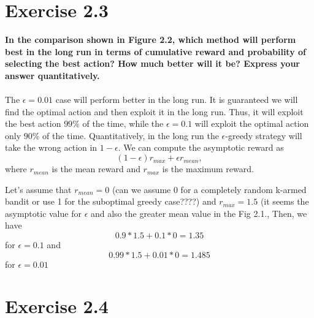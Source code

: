 \documentclass[a4paper,11pt]{article}
\numberwithin{equation}{section}
\theoremstyle{remark}
\begin{document}
\section{Exercise 2.3}

\textbf{In the comparison shown in Figure 2.2, which method will perform best in the long run in terms of cumulative reward and probability of selecting the best action? How much better will it be? Express your answer quantitatively.}
\\ \\

The $\epsilon=0.01$ case will perform better in the long run. It is guaranteed we will find the optimal action and then exploit it in the long run. Thus, it will exploit the best action  $99\%$ of the time, while the $\epsilon=0.1$  will exploit the optimal action only $90\%$ of the time.
Quantitatively, in the long run the $\epsilon$-greedy strategy will take the wrong action in $1 - \epsilon$. We can compute the asymptotic reward as
 $$(1 - \epsilon) r_{max} + \epsilon r_{mean},$$
where  $r_{mean}$ is the mean reward and  $r_{max}$ is the maximum reward. 

Let's assume that $r_{mean}=0$ (can we assume 0 for a completely random k-armed bandit or use 1 for the suboptimal greedy case????) and $r_{max} =1.5$ (it seems the asymptotic value for $\epsilon$ and also the greater mean value in the Fig 2.1.,  Then, we have 
$$
0.9*1.5 + 0.1 *0 = 1.35 
$$
for $\epsilon=0.1$ and 
$$
0.99*1.5 + 0.01*0 = 1.485
$$
for $\epsilon=0.01$   



\section{Exercise 2.4}
\end{document}
